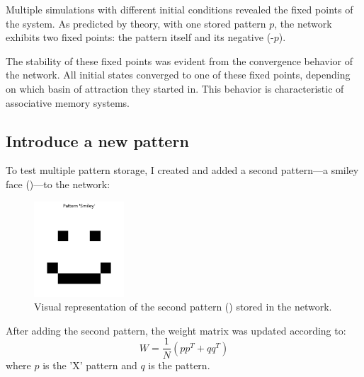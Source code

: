 \documentclass{article}
\begin{document}
Multiple simulations with different initial conditions revealed the fixed points of the system. As predicted by theory, with one stored pattern $p$, the network exhibits two fixed points: the pattern itself and its negative (-$p$).

The stability of these fixed points was evident from the convergence behavior of the network. All initial states converged to one of these fixed points, depending on which basin of attraction they started in. This behavior is characteristic of associative memory systems.



\subsection{Introduce a new pattern}

To test multiple pattern storage, I created and added a second pattern—a smiley face (\smiley{})—to the network:

\begin{figure}[H]
\centering
\includegraphics[width=0.3\textwidth]{Pattern 'Smiley'.png}
\caption{Visual representation of the second pattern (\smiley{}) stored in the network.}
\label{fig:pattern2}
\end{figure}

After adding the second pattern, the weight matrix was updated according to:
\begin{equation}
W = \frac{1}{N}(pp^T + qq^T)
\end{equation}
where $p$ is the 'X' pattern and $q$ is the \smiley{} pattern.
\end{document}
